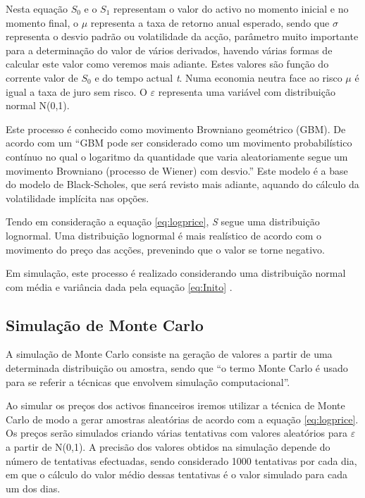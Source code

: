 \documentclass[
  12pt,
  a4paper,
  openany]{book}
\theoremstyle{definition}
\theoremstyle{definition}
\theoremstyle{definition}
\theoremstyle{remark}
\begin{document}
Nesta equação \(S_0\) e o \(S_1\) representam o valor do activo no momento inicial e no momento final, o \(\mu\) representa a taxa de retorno anual esperado, sendo que \(\sigma\) representa o desvio padrão ou volatilidade da acção, parâmetro muito importante para a determinação do valor de vários derivados, havendo várias formas de calcular este valor como veremos mais adiante. Estes valores são função do corrente valor de \(S_0\) e do tempo actual \emph{t}. Numa economia neutra face ao risco \(\mu\) é igual a taxa de juro sem risco. O \(\varepsilon\) representa uma variável com distribuição normal N(0,1).

Este processo é conhecido como movimento Browniano geométrico (GBM). De acordo com \citet{AppliedFinancial} um ``GBM pode ser considerado como um movimento probabilístico contínuo no qual o logaritmo da quantidade que varia aleatoriamente segue um movimento Browniano (processo de Wiener) com desvio.'' Este modelo é a base do modelo de Black-Scholes, que será revisto mais adiante, aquando do cálculo da volatilidade implícita nas opções.

Tendo em consideração a equação \eqref{eq:logprice}, \emph{S} segue uma distribuição lognormal. Uma distribuição lognormal é mais realístico de acordo com o movimento do preço das acções, prevenindo que o valor se torne negativo.

Em simulação, este processo é realizado considerando uma distribuição normal com média e variância dada pela equação \eqref{eq:Inito} \citep{FRM1}.

\hypertarget{simulauxe7uxe3o-de-monte-carlo}{%
\subsection{Simulação de Monte Carlo}\label{simulauxe7uxe3o-de-monte-carlo}}

A simulação de Monte Carlo consiste na geração de valores a partir de uma determinada distribuição ou amostra, sendo que ``o termo Monte Carlo é usado para se referir a técnicas que envolvem simulação computacional''\citep[pp.457]{ProgSim}.

Ao simular os preços dos activos financeiros iremos utilizar a técnica de Monte Carlo de modo a gerar amostras aleatórias de acordo com a equação \eqref{eq:logprice}. Os preços serão simulados criando várias tentativas com valores aleatórios para \(\varepsilon\) a partir de N(0,1). A precisão dos valores obtidos na simulação depende do número de tentativas efectuadas, sendo considerado 1000 tentativas por cada dia, em que o cálculo do valor médio dessas tentativas é o valor simulado para cada um dos dias.
\end{document}
